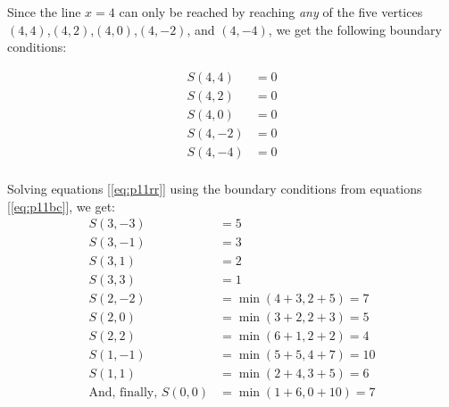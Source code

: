 \documentclass[english,notitlepage,smartquotes]{hgbreport}
\theoremstyle{definition}
\theoremstyle{definition}
\theoremstyle{remark}
\theoremstyle{definition}
\theoremstyle{plain}
\theoremstyle{definition}
\begin{document}
Since the line $x=4$ can only be reached by reaching \emph{any} of the five vertices $(4,4)$,$(4,2)$,$(4,0)$,$(4,-2)$, and $(4,-4)$, we get the following boundary conditions:

\begin{equation}
\begin{aligned}
S(4,4) &= 0\\
S(4,2) &= 0\\
S(4,0) &= 0\\
S(4,-2) &= 0\\
S(4,-4) &= 0\\
\end{aligned}
\label{eq:p11bc}
\end{equation}

Solving equations [\ref{eq:p11rr}] using the boundary conditions from equations [\ref{eq:p11bc}], we get:
\begin{equation}
\begin{aligned}
S(3,-3) &= 5\\
S(3,-1) &= 3\\
S(3,1) &= 2\\
S(3,3) &= 1\\
S(2,-2) &= \min(4+3,2+5)=7\\
S(2,0) &= \min(3+2,2+3)=5\\
S(2,2) &= \min(6+1,2+2)=4\\
S(1,-1) &= \min(5+5,4+7)=10\\
S(1,1) &= \min(2+4,3+5)=6\\
\text{And, finally, } S(0,0) &=\min(1+6,0+10)=7
\end{aligned}
\label{eq:p11sol}
\end{equation}
\MakeBibliography[nosplit]

\end{document}
